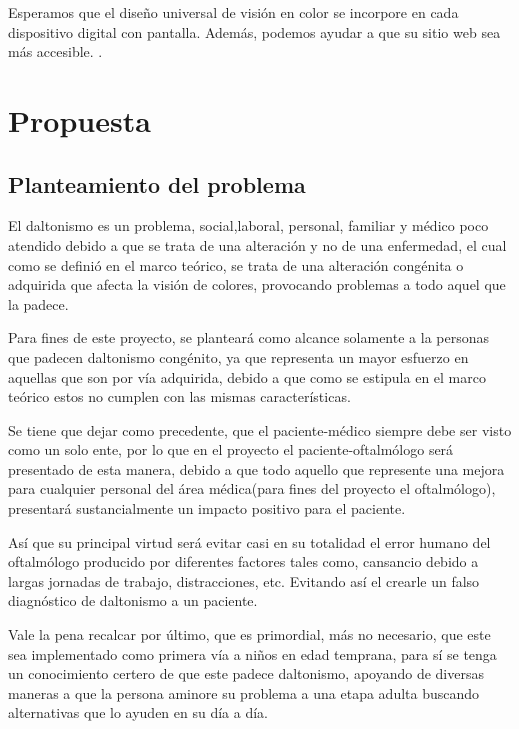 \documentclass[10pt]{article}
\begin{document}
\setlength{\parskip}{2mm}

Esperamos que el diseño universal de visión en color se incorpore en cada dispositivo digital con pantalla. Además, podemos ayudar a que su sitio web sea más accesible.
\cite{IEEEreferencias:Ref20}.

\newpage
\section{Propuesta}

\subsection{Planteamiento del problema}

El daltonismo es un problema, social,laboral, personal, familiar y médico poco atendido debido a que se trata de una alteración y no de una enfermedad, el cual como se definió en el marco teórico, se trata de una alteración congénita o adquirida que afecta la visión de colores, provocando problemas a todo aquel que la padece.

Para fines de este proyecto, se planteará como alcance solamente a la personas que padecen daltonismo congénito, ya que representa un mayor esfuerzo en aquellas que son por vía adquirida, debido a que como se estipula en el marco teórico estos no cumplen con las mismas características.

Se tiene que dejar como precedente, que el paciente-médico siempre debe ser visto como un solo ente, por lo que en el proyecto el paciente-oftalmólogo será presentado de esta manera, debido a que todo aquello que represente una mejora para cualquier personal del área médica(para fines del proyecto el oftalmólogo), presentará sustancialmente un impacto positivo para el paciente.

Así que su principal virtud será evitar casi en su totalidad el error humano del oftalmólogo producido por diferentes factores tales como, cansancio debido a largas jornadas de trabajo, distracciones, etc. Evitando así el crearle un falso diagnóstico de daltonismo a un paciente.

Vale la pena recalcar por último, que es primordial, más no necesario, que este sea implementado como primera vía a niños en edad temprana, para sí se tenga un conocimiento certero de que este padece daltonismo, apoyando de diversas maneras a que la persona aminore su problema a una etapa adulta buscando alternativas que lo ayuden en su día a día.
\end{document}
